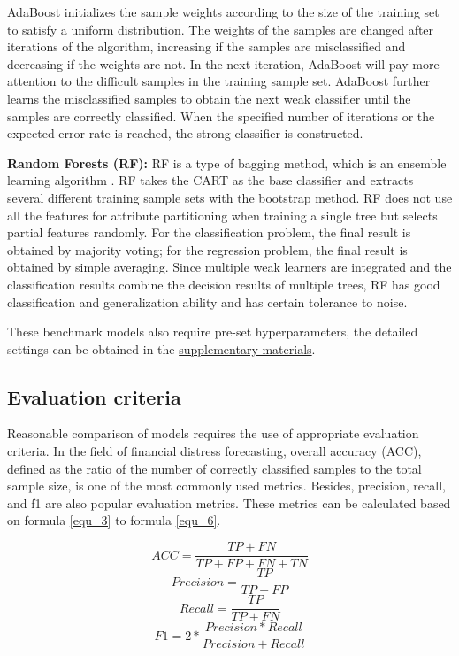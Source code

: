 \documentclass[review]{elsarticle}
\begin{document}
AdaBoost initializes the sample weights according to the size of the training set to satisfy a uniform distribution. The weights of the samples are changed after iterations of the algorithm, increasing if the samples are misclassified and decreasing if the weights are not. In the next iteration, AdaBoost will pay more attention to the difficult samples in the training sample set. AdaBoost further learns the misclassified samples to obtain the next weak classifier until the samples are correctly classified. When the specified number of iterations or the expected error rate is reached, the strong classifier is constructed.

\textbf{Random Forests (RF):} RF is a type of bagging method, which is an ensemble learning algorithm \citep{Breiman2001}. RF takes the CART as the base classifier and extracts several different training sample sets with the bootstrap method. RF does not use all the features for attribute partitioning when training a single tree but selects partial features randomly. For the classification problem, the final result is obtained by majority voting; for the regression problem, the final result is obtained by simple averaging. Since multiple weak learners are integrated and the classification results combine the decision results of multiple trees, RF has good classification and generalization ability and has certain tolerance to noise.


These benchmark models also require pre-set hyperparameters, the detailed settings can be obtained in the \hyperref[supplementary_materials]{supplementary materials}.

\subsection{Evaluation criteria}
Reasonable comparison of models requires the use of appropriate evaluation criteria. In the field of financial distress forecasting, overall accuracy (ACC), defined as the ratio of the number of correctly classified samples to the total sample size, is one of the most commonly used metrics. Besides, precision, recall, and f1 are also popular evaluation metrics. These metrics can be calculated based on formula \ref{equ_3} to formula \ref{equ_6}.

\begin{equation} \label{equ_3}
    ACC = \frac{TP+FN}{TP+FP+FN+TN}
\end{equation}
\begin{equation} \label{equ_4}
    Precision = \frac{TP}{TP+FP}
\end{equation}
\begin{equation} \label{equ_5}
    Recall = \frac{TP}{TP+FN}
\end{equation}
\begin{equation} \label{equ_6}
    F1 = 2*\frac{Precision*Recall}{Precision+Recall}
\end{equation}
\end{document}
